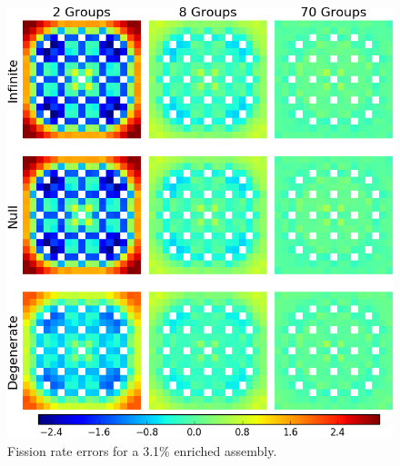 \begin{figure}[h!]
\centering
\includegraphics[width=\linewidth]{figures/quantification/assm-31/fiss-err}
\caption[Fission rate errors for a 3.1\% enriched assembly]{Fission rate errors for a 3.1\% enriched assembly.}
\label{fig:chap8-assm-3.1-fiss-err}
\end{figure}

